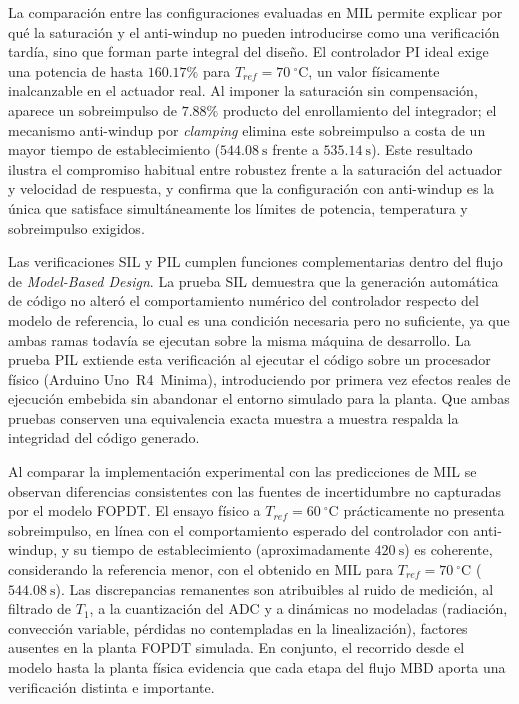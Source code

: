 \documentclass[journal]{IEEEtran}
\begin{document}
La comparación entre las configuraciones evaluadas en MIL permite explicar por qué la saturación y el
anti-windup no pueden introducirse como una verificación tardía, sino que forman parte integral del
diseño. El controlador PI ideal exige una potencia de hasta $160.17\%$ para $T_{ref}=70~^\circ$C, un
valor físicamente inalcanzable en el actuador real. Al imponer la saturación sin compensación, aparece
un sobreimpulso de $7.88\%$ producto del enrollamiento del integrador; el mecanismo anti-windup por
\textit{clamping} elimina este sobreimpulso a costa de un mayor tiempo de establecimiento
($544.08~\mathrm{s}$ frente a $535.14~\mathrm{s}$). Este resultado ilustra el compromiso habitual entre
robustez frente a la saturación del actuador y velocidad de respuesta, y confirma que la configuración
con anti-windup es la única que satisface simultáneamente los límites de potencia, temperatura y
sobreimpulso exigidos.

Las verificaciones SIL y PIL cumplen funciones complementarias dentro del flujo de \textit{Model-Based
Design}. La prueba SIL demuestra que la generación automática de código no alteró el comportamiento
numérico del controlador respecto del modelo de referencia, lo cual es una condición necesaria pero no
suficiente, ya que ambas ramas todavía se ejecutan sobre la misma máquina de desarrollo. La prueba PIL
extiende esta verificación al ejecutar el código sobre un procesador físico (Arduino Uno~R4~Minima),
introduciendo por primera vez efectos reales de ejecución embebida sin abandonar el entorno simulado
para la planta. Que ambas pruebas conserven una equivalencia exacta muestra a muestra respalda la
integridad del código generado.

Al comparar la implementación experimental con las predicciones de MIL se observan diferencias
consistentes con las fuentes de incertidumbre no capturadas por el modelo FOPDT. El ensayo físico a
$T_{ref}=60~^\circ$C prácticamente no presenta sobreimpulso, en línea con el comportamiento esperado
del controlador con anti-windup, y su tiempo de establecimiento (aproximadamente $420~\mathrm{s}$)
es coherente, considerando la referencia menor, con el obtenido en MIL para $T_{ref}=70~^\circ$C
($544.08~\mathrm{s}$). Las discrepancias remanentes son atribuibles al ruido de medición, al filtrado de
$T_1$, a la cuantización del ADC y a dinámicas no modeladas (radiación, convección variable, pérdidas
no contempladas en la linealización), factores ausentes en la planta FOPDT simulada. En conjunto, el
recorrido desde el modelo hasta la planta física evidencia que cada etapa del flujo MBD aporta una
verificación distinta e importante.
\end{document}
